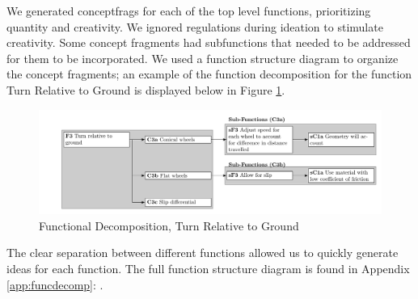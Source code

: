 \documentclass[class=../report, crop=false]{standalone}
\begin{document}
\clearpage

We generated \gls{conceptfrags} for each of the top level functions, prioritizing quantity and creativity.
We ignored regulations during ideation to stimulate creativity.
Some concept fragments had subfunctions that needed to be addressed for them to be incorporated.
We used a function structure diagram to organize the concept fragments; an example of the function decomposition for the function Turn Relative to Ground is displayed below in Figure \ref{fig:turn-relative-to-ground}.

\begin{figure}[h!]
	\centering
	\includegraphics[width=\textwidth]{../../bin/turn_relative_to_ground.pdf}
	\caption{Functional Decomposition, Turn Relative to Ground}
	\label{fig:turn-relative-to-ground}
\end{figure}

The clear separation between different functions allowed us to quickly generate ideas for each function.
The full function structure diagram is found in Appendix \ref{app:funcdecomp}: .
\end{document}
